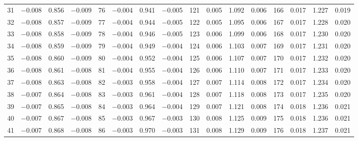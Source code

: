 \begin{table}[!h]
{\begin{tabular}{rrrr|rrrr|rrrr|crrr}
 31 & \tiny{ $-$0.008} &   0.856 & \tiny{ $-$0.009} &  76 & \tiny{ $-$0.004} &   0.941 & \tiny{ $-$0.005} & 121 & \tiny{  0.005} &   1.092 & \tiny{  0.006} & 166 & \tiny{  0.017} &   1.227 & \tiny{  0.019}\\
 32 & \tiny{ $-$0.008} &   0.857 & \tiny{ $-$0.009} &  77 & \tiny{ $-$0.004} &   0.944 & \tiny{ $-$0.005} & 122 & \tiny{  0.005} &   1.095 & \tiny{  0.006} & 167 & \tiny{  0.017} &   1.228 & \tiny{  0.020}\\
 33 & \tiny{ $-$0.008} &   0.858 & \tiny{ $-$0.009} &  78 & \tiny{ $-$0.004} &   0.946 & \tiny{ $-$0.005} & 123 & \tiny{  0.006} &   1.099 & \tiny{  0.006} & 168 & \tiny{  0.017} &   1.230 & \tiny{  0.020}\\
 34 & \tiny{ $-$0.008} &   0.859 & \tiny{ $-$0.009} &  79 & \tiny{ $-$0.004} &   0.949 & \tiny{ $-$0.004} & 124 & \tiny{  0.006} &   1.103 & \tiny{  0.007} & 169 & \tiny{  0.017} &   1.231 & \tiny{  0.020}\\
 35 & \tiny{ $-$0.008} &   0.860 & \tiny{ $-$0.009} &  80 & \tiny{ $-$0.004} &   0.952 & \tiny{ $-$0.004} & 125 & \tiny{  0.006} &   1.107 & \tiny{  0.007} & 170 & \tiny{  0.017} &   1.232 & \tiny{  0.020}\\
 36 & \tiny{ $-$0.008} &   0.861 & \tiny{ $-$0.008} &  81 & \tiny{ $-$0.004} &   0.955 & \tiny{ $-$0.004} & 126 & \tiny{  0.006} &   1.110 & \tiny{  0.007} & 171 & \tiny{  0.017} &   1.233 & \tiny{  0.020}\\
 37 & \tiny{ $-$0.008} &   0.863 & \tiny{ $-$0.008} &  82 & \tiny{ $-$0.003} &   0.958 & \tiny{ $-$0.004} & 127 & \tiny{  0.007} &   1.114 & \tiny{  0.008} & 172 & \tiny{  0.017} &   1.234 & \tiny{  0.020}\\
 38 & \tiny{ $-$0.007} &   0.864 & \tiny{ $-$0.008} &  83 & \tiny{ $-$0.003} &   0.961 & \tiny{ $-$0.004} & 128 & \tiny{  0.007} &   1.118 & \tiny{  0.008} & 173 & \tiny{  0.017} &   1.235 & \tiny{  0.020}\\
 39 & \tiny{ $-$0.007} &   0.865 & \tiny{ $-$0.008} &  84 & \tiny{ $-$0.003} &   0.964 & \tiny{ $-$0.004} & 129 & \tiny{  0.007} &   1.121 & \tiny{  0.008} & 174 & \tiny{  0.018} &   1.236 & \tiny{  0.021}\\
 40 & \tiny{ $-$0.007} &   0.867 & \tiny{ $-$0.008} &  85 & \tiny{ $-$0.003} &   0.967 & \tiny{ $-$0.003} & 130 & \tiny{  0.008} &   1.125 & \tiny{  0.009} & 175 & \tiny{  0.018} &   1.236 & \tiny{  0.021}\\
 41 & \tiny{ $-$0.007} &   0.868 & \tiny{ $-$0.008} &  86 & \tiny{ $-$0.003} &   0.970 & \tiny{ $-$0.003} & 131 & \tiny{  0.008} &   1.129 & \tiny{  0.009} & 176 & \tiny{  0.018} &   1.237 & \tiny{  0.021}\\

\end{tabular}}
\end{table}
